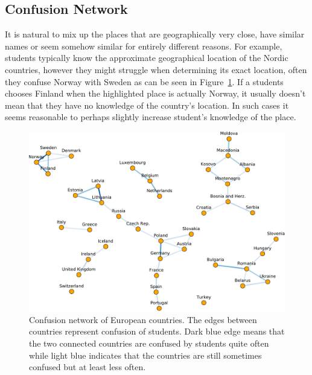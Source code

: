 \subsection{Confusion Network}

It is natural to mix up the places that are geographically very close, have similar names or seem somehow similar for entirely different reasons. For example, students typically know the approximate geographical location of the Nordic countries, however they might struggle when determining its exact location, often they confuse Norway with Sweden as can be seen in Figure~\ref{fig:confusion-network}. If a students chooses Finland when the highlighted place is actually Norway, it usually doesn't mean that they have no knowledge of the country's location. In such cases it seems reasonable to perhaps slightly increase student's knowledge of the place.

\begin{figure}[htbp]
  \centering
  \includegraphics[width=\textwidth]{img/confusion-network}
  \caption{Confusion network of European countries. The edges between countries represent confusion of students. Dark blue edge means that the two connected countries are confused by students quite often while light blue indicates that the countries are still sometimes confused but at least less often.}
  \label{fig:confusion-network}
\end{figure}
